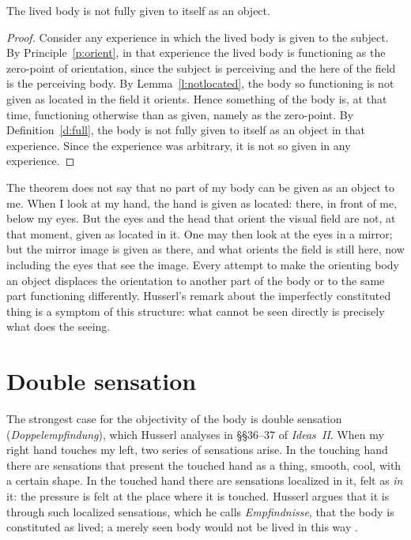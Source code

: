 \documentclass{situationist-preprint}
\begin{document}
\begin{theorem}\label{t:notobj}
The lived body is not fully given to itself as an object.
\end{theorem}

\begin{proof}
Consider any experience in which the lived body is given to the subject. By Principle~\ref{p:orient}, in that experience the lived body is functioning as the zero-point of orientation, since the subject is perceiving and the here of the field is the perceiving body. By Lemma~\ref{l:notlocated}, the body so functioning is not given as located in the field it orients. Hence something of the body is, at that time, functioning otherwise than as given, namely as the zero-point. By Definition~\ref{d:full}, the body is not fully given to itself as an object in that experience. Since the experience was arbitrary, it is not so given in any experience.
\end{proof}

The theorem does not say that no part of my body can be given as an object to me. When I look at my hand, the hand is given as located: there, in front of me, below my eyes. But the eyes and the head that orient the visual field are not, at that moment, given as located in it. One may then look at the eyes in a mirror; but the mirror image is given as there, and what orients the field is still here, now including the eyes that see the image. Every attempt to make the orienting body an object displaces the orientation to another part of the body or to the same part functioning differently. Husserl's remark about the imperfectly constituted thing is a symptom of this structure: what cannot be seen directly is precisely what does the seeing.

\section{Double sensation}\label{s:double}

The strongest case for the objectivity of the body is double sensation (\emph{Doppelempfindung}), which Husserl analyses in \S\S36--37 of \emph{Ideas~II}. When my right hand touches my left, two series of sensations arise. In the touching hand there are sensations that present the touched hand as a thing, smooth, cool, with a certain shape. In the touched hand there are sensations localized in it, felt as \emph{in} it: the pressure is felt at the place where it is touched. Husserl argues that it is through such localized sensations, which he calls \emph{Empfindnisse}, that the body is constituted as lived; a merely seen body would not be lived in this way \citep[\S\S36--37]{Husserl1952}.
\end{document}
